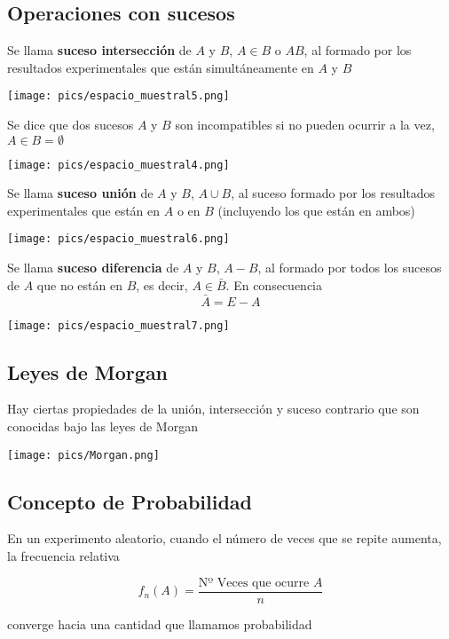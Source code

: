 \documentclass[]{article}
\numberwithin{equation}{section}
\begin{document}
\subsection{Operaciones con sucesos}\label{operaciones-con-sucesos}

Se llama \textbf{suceso intersección} de \(A\) y \(B\), \(A\in B\) o
\(AB\), al formado por los resultados experimentales que están
simultáneamente en \(A\) y \(B\)

\texttt{[image: pics/espacio\_muestral5.png]}

Se dice que dos sucesos \(A\) y \(B\) son incompatibles si no pueden
ocurrir a la vez, \(A\in B=\emptyset\)

\texttt{[image: pics/espacio\_muestral4.png]}

Se llama \textbf{suceso unión} de \(A\) y \(B\), \(A\cup B\), al suceso
formado por los resultados experimentales que están en \(A\) o en \(B\)
(incluyendo los que están en ambos)

\texttt{[image: pics/espacio\_muestral6.png]}

Se llama \textbf{suceso diferencia} de \(A\) y \(B\), \(A-B\), al
formado por todos los sucesos de \(A\) que no están en \(B\), es decir,
\(A\in \bar{B}\). En consecuencia \[
    \bar{A} = E - A
\]

\texttt{[image: pics/espacio\_muestral7.png]}

\subsection{Leyes de Morgan}\label{leyes-de-morgan}

Hay ciertas propiedades de la unión, intersección y suceso contrario que
son conocidas bajo las leyes de Morgan

\texttt{[image: pics/Morgan.png]}

\subsection{Concepto de Probabilidad}\label{concepto-de-probabilidad}

En un experimento aleatorio, cuando el número de veces que se repite
aumenta, la frecuencia relativa

\[
    f_n(A)  = \frac{\mbox{Nº Veces que ocurre $A$}}{n}
\]

converge hacia una cantidad que llamamos probabilidad
\end{document}
